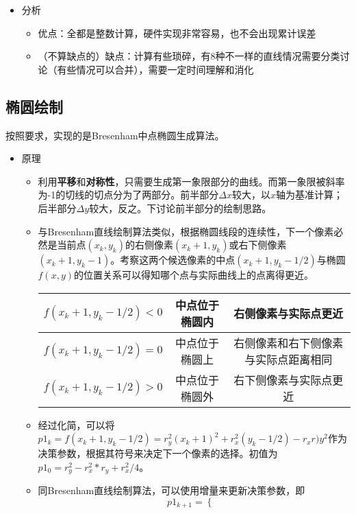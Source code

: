 \documentclass[a4paper,UTF8]{article}
\theoremstyle{definition}
\begin{document}
\begin{itemize}
\begin{itemize}
  \end{itemize}
  \item 分析
  \begin{itemize}
    \item 优点：全都是整数计算，硬件实现非常容易，也不会出现累计误差
    \item （不算缺点的）缺点：计算有些琐碎，有8种不一样的直线情况需要分类讨论（有些情况可以合并），需要一定时间理解和消化
  \end{itemize}
\end{itemize}

\subsection{椭圆绘制}
按照要求，实现的是Bresenham中点椭圆生成算法。
\begin{itemize}
  \item 原理\cite{rog_2002}
  \begin{itemize}
    \item 利用\textbf{平移}和\textbf{对称性}，只需要生成第一象限部分的曲线。而第一象限被斜率为-1的切线的切点分为了两部分。前半部分$\Delta x$较大，以$x$轴为基准计算；后半部分$\Delta y$较大，反之。下讨论前半部分的绘制思路。
    \item 与Bresenham直线绘制算法类似，根据椭圆线段的连续性，下一个像素必然是当前点$(x_k, y_k)$的右侧像素$(x_k+1,y_k)$或右下侧像素$(x_k+1, y_k-1)$。考察这两个候选像素的中点$(x_k+1, y_k-1/2)$与椭圆$f(x,y)$的位置关系可以得知哪个点与实际曲线上的点离得更近。
    \begin{table}[h]
      \centering
      \begin{tabular}{c|c|c}
        \hline\hline
        $f(x_k+1, y_k-1/2)<0$ & 中点位于椭圆内 & 右侧像素与实际点更近\\\hline
        $f(x_k+1, y_k-1/2)=0$ & 中点位于椭圆上 & 右侧像素和右下侧像素与实际点距离相同\\\hline
        $f(x_k+1, y_k-1/2)>0$ & 中点位于椭圆外 & 右下侧像素与实际点更近\\\hline\hline
      \end{tabular}
    \end{table}
    \item 经过化简，可以将$p1_k=f(x_k+1,y_k-1/2)=r_y^2(x_k+1)^2+r_x^2(y_k-1/2)-r_xr)y^2$作为决策参数，根据其符号来决定下一个像素的选择。初值为$p1_0=r_y^2-r_x^2*r_y+r_x^2/4$。
    \item 同Bresenham直线绘制算法，可以使用增量来更新决策参数，即
    $$p1_{k+1}=\begin{cases}

\end{cases}$$
\end{itemize}
\end{itemize}
\end{document}
